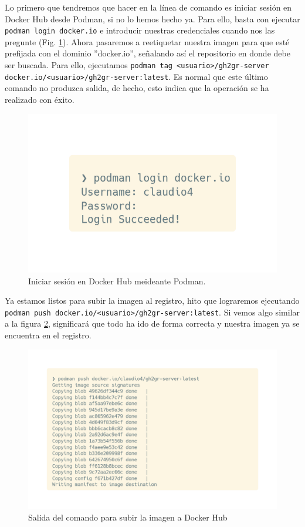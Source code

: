 \begin{sloppypar}
Lo primero que tendremos que hacer en la línea de comando es iniciar sesión en Docker Hub desde Podman, si no lo hemos hecho ya. Para ello, basta con ejecutar \texttt{podman login docker.io} e introducir nuestras credenciales cuando nos las pregunte (Fig. \ref{fig:podman-login}). Ahora pasaremos a reetiquetar nuestra imagen para que esté prefijada con el dominio ''docker.io'', señalando así el repositorio en donde debe ser buscada. Para ello, ejecutamos \texttt{podman tag <usuario>/gh2gr-server docker.io/<usuario>/gh2gr-server:latest}. Es normal que este último comando no produzca salida, de hecho, esto indica que la operación se ha realizado con éxito.

\end{sloppypar}

\begin{figure}
    \centering
    \includegraphics[width=0.75\linewidth]{images/podman-login.png}
    \caption{Iniciar sesión en Docker Hub meideante Podman.}
    \label{fig:podman-login}
\end{figure}

Ya estamos listos para subir la imagen al registro, hito que lograremos ejecutando \texttt{podman push docker.io/<usuario>/gh2gr-server:latest}. Si vemos algo similar a la figura \ref{fig:push-server-image}, significará que todo ha ido de forma correcta y nuestra imagen ya se encuentra en el registro.

\begin{figure}
    \centering
    \includegraphics[width=0.75\linewidth]{images/push-server-image.png}
    \caption{Salida del comando para subir la imagen a Docker Hub}
    \label{fig:push-server-image}
\end{figure}

